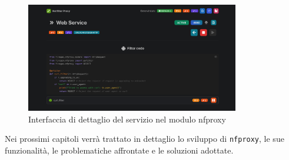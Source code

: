 \begin{figure}[H]
    \centering
    \includegraphics[width=0.83\textwidth]{images/chapter2/NFProxyInterface.png}
    \caption{Interfaccia di dettaglio del servizio nel modulo nfproxy}\label{fig:nfproxy_interface}
\end{figure}

Nei prossimi capitoli verrà trattato in dettaglio lo sviluppo di \texttt{nfproxy}, le sue funzionalità, le problematiche affrontate e le soluzioni adottate.
